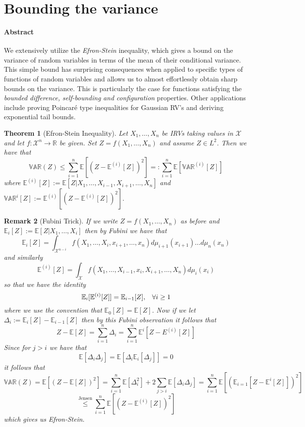 \documentclass{amsproc}
\newtheorem{theorem}{Theorem}
\newtheorem{remark}[theorem]{Remark}
\newcommand{\R}{\mathbb{R}}
\newcommand{\E}{\mathbb{E}}
\newcommand{\var}{\mathbb{VAR}}
\begin{document}

\section{Bounding the variance}
\label{sec:bound_var}
\paragraph{\textbf{Abstract}}
We extensively utilize the \textit{Efron-Stein} inequality, which gives a bound on the variance of random variables in terms of the mean of their conditional variance. This simple bound has surprising consequences when applied to specific types of functions of random variables and allows us to almost effortlessly obtain sharp bounds on the variance. This is particularly the case for functions satisfying the \textit{bounded difference, self-bounding and configuration} properties. Other applications include proving Poincar\'{e} type inequalities for Gaussian RV's and deriving exponential tail bounds.

\begin{theorem}[Efron-Stein Inequality]
\label{thm:ESI}
Let $X_1,\dots,X_n$ be IRVs taking values in $\mathcal{X}$ and let $f: \mathcal{X}^n \to \R$ be given. Set $Z = f(X_1,\dots,X_n)$ and assume $Z \in L^2$. Then we have that 
$$\var(Z)\leq \sum\limits_{i=1}^n \E[(Z-\E^{(i)}[Z])^2] =: \sum\limits_{i=1}^n \E[\var^{(i)}[Z]]$$ where 
$\E^{(i)}[Z] := \E[Z|X_1,\dots,X_{i-1},X_{i+1},\dots,X_n]$ and $\var^{i}[Z] := \E^{(i)}[(Z - \E^{(i)}[Z])^2].$ 
\end{theorem}

\begin{remark}[Fubini Trick]
\label{rmk:Fubini}
If we write $Z = f(X_1,\dots,X_n)$ as before and 
$\E_i[Z] := \E[Z|X_1,\dots,X_i]$ then by Fubini we have that 
$$\E_i[Z] = \int_{\mathcal{X}^{n-i}} f(X_1,\dots,X_i,x_{i+1},\dots,x_{n})d\mu_{i+1}(x_{i+1})\dots d\mu_n(x_{n})$$ and similarly
$$\E^{(i)}[Z] = \int_\mathcal{X} f(X_1,\dots,X_{i-1},x_i,X_{i+1},\dots,X_n)d\mu_i(x_i)$$ so that we have the identity
$$\E_i[\E^{(i)}[Z]] = \E_{i-1}[Z], \hspace{0.3 cm} \forall i \geq 1$$
where we use the convention that $\E_0[Z] = \E[Z]$. Now if we let $\Delta_i := \E_i[Z] - \E_{i-1}[Z]$ then by this Fubini observation it follows that 
$$Z - \E[Z] = \sum\limits_{i=1}^n \Delta_i = \sum\limits_{i=1}^n \E^i[Z - E^{(i)}[Z]]$$ 
Since for $j > i$ we have that
$$\E[\Delta_i\Delta_j] = \E[\Delta_i\E_i[\Delta_j]] = 0$$ it follows that 
$$\var(Z) = \E[(Z-\E[Z])^2] = \sum\limits_{i=1}^n \E[\Delta_i^2] + 2\sum\limits_{j>i}\E[\Delta_i\Delta_j] = \sum\limits_{i=1}^n \E[(\E_{i=1}[Z - \E^{i}[Z]])^2]$$
$$\stackrel{\text{Jensen}}\leq\sum\limits_{i=1}^n \E[(Z - \E^{(i)}[Z])^2]$$ which gives us Efron-Stein.  
\end{remark}
\end{document}
